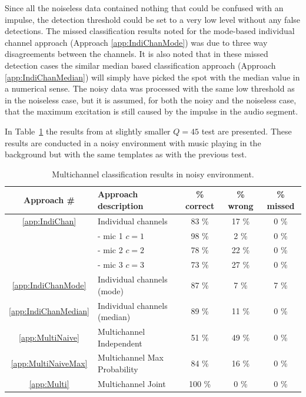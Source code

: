 Since all the noiseless data contained nothing that could be confused with an impulse, the detection threshold could be set to a very low level without any false detections. The missed classification results noted for the mode-based individual channel approach (Approach \ref{app:IndiChanMode}) was due to three way disagreements between the channels. It is also noted that in these missed detection cases the similar median based classification approach (Approach \ref{app:IndiChanMedian}) will simply have picked the spot with the median value in a numerical sense. The noisy data was processed with the same low threshold as in the noiseless case, but it is assumed, for both the noisy and the noiseless case, that the maximum excitation is still caused by the impulse in the audio segment.

In Table~\ref{tab:multiAPRresultsNoise} the results from at slightly smaller $Q=45$ test are presented. These results are conducted in a noisy environment with music playing in the background but with the same templates as with the previous test.

\begin{table}\begin{center}
\caption{Multichannel classification results in noisy environment.}
\label{tab:multiAPRresultsNoise}
\begin{tabular}{|c|l|c|c|c|}\hline
Approach \#             & Approach description        & \% correct    & \% wrong  & \% missed  \\ \hline
\ref{app:IndiChan}      & Individual channels         & 83 \%         & 17 \%     & 0 \%       \\
                        &  - mic 1 $c = 1$            & 98 \%         & 2 \%      & 0 \%       \\
                        &  - mic 2 $c = 2$            & 78 \%         & 22 \%     & 0 \%       \\
                        &  - mic 3 $c = 3$            & 73 \%         & 27 \%     & 0 \%       \\
\ref{app:IndiChanMode}  & Individual channels (mode)  & 87 \%         & 7 \%      & 7 \%       \\
\ref{app:IndiChanMedian}& Individual channels (median)& 89 \%         & 11 \%     & 0 \%       \\
\ref{app:MultiNaive}    & Multichannel Independent    & 51 \%         & 49 \%     & 0 \%       \\
\ref{app:MultiNaiveMax} & Multichannel Max Probability& 84 \%         & 16 \%     & 0 \%       \\
\ref{app:Multi}         & Multichannel Joint          & 100 \%        & 0 \%      & 0 \%       \\ \hline
\end{tabular}\end{center}\end{table}


